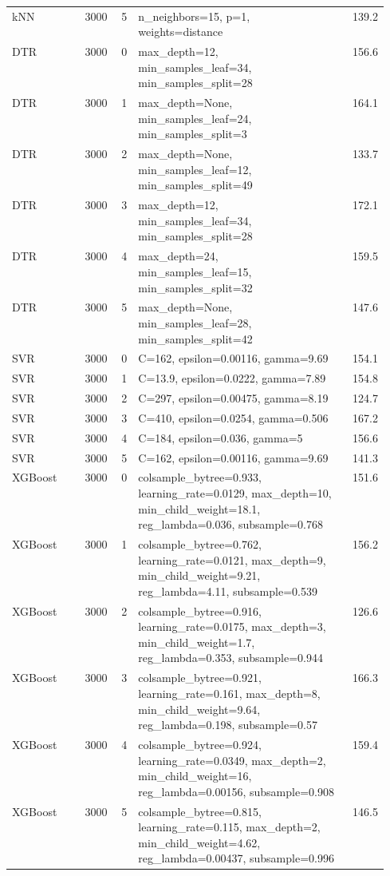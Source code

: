 \begin{longtable}{lrrp{0.55\linewidth}r}
kNN & 3000 & 5 & n\_neighbors=15, p=1, weights=distance & 139.2 \\
DTR & 3000 & 0 & max\_depth=12, min\_samples\_leaf=34, min\_samples\_split=28 & 156.6 \\
DTR & 3000 & 1 & max\_depth=None, min\_samples\_leaf=24, min\_samples\_split=3 & 164.1 \\
DTR & 3000 & 2 & max\_depth=None, min\_samples\_leaf=12, min\_samples\_split=49 & 133.7 \\
DTR & 3000 & 3 & max\_depth=12, min\_samples\_leaf=34, min\_samples\_split=28 & 172.1 \\
DTR & 3000 & 4 & max\_depth=24, min\_samples\_leaf=15, min\_samples\_split=32 & 159.5 \\
DTR & 3000 & 5 & max\_depth=None, min\_samples\_leaf=28, min\_samples\_split=42 & 147.6 \\
SVR & 3000 & 0 & C=162, epsilon=0.00116, gamma=9.69 & 154.1 \\
SVR & 3000 & 1 & C=13.9, epsilon=0.0222, gamma=7.89 & 154.8 \\
SVR & 3000 & 2 & C=297, epsilon=0.00475, gamma=8.19 & 124.7 \\
SVR & 3000 & 3 & C=410, epsilon=0.0254, gamma=0.506 & 167.2 \\
SVR & 3000 & 4 & C=184, epsilon=0.036, gamma=5 & 156.6 \\
SVR & 3000 & 5 & C=162, epsilon=0.00116, gamma=9.69 & 141.3 \\
XGBoost & 3000 & 0 & colsample\_bytree=0.933, learning\_rate=0.0129, max\_depth=10, min\_child\_weight=18.1, reg\_lambda=0.036, subsample=0.768 & 151.6 \\
XGBoost & 3000 & 1 & colsample\_bytree=0.762, learning\_rate=0.0121, max\_depth=9, min\_child\_weight=9.21, reg\_lambda=4.11, subsample=0.539 & 156.2 \\
XGBoost & 3000 & 2 & colsample\_bytree=0.916, learning\_rate=0.0175, max\_depth=3, min\_child\_weight=1.7, reg\_lambda=0.353, subsample=0.944 & 126.6 \\
XGBoost & 3000 & 3 & colsample\_bytree=0.921, learning\_rate=0.161, max\_depth=8, min\_child\_weight=9.64, reg\_lambda=0.198, subsample=0.57 & 166.3 \\
XGBoost & 3000 & 4 & colsample\_bytree=0.924, learning\_rate=0.0349, max\_depth=2, min\_child\_weight=16, reg\_lambda=0.00156, subsample=0.908 & 159.4 \\
XGBoost & 3000 & 5 & colsample\_bytree=0.815, learning\_rate=0.115, max\_depth=2, min\_child\_weight=4.62, reg\_lambda=0.00437, subsample=0.996 & 146.5 \\

\end{longtable}
